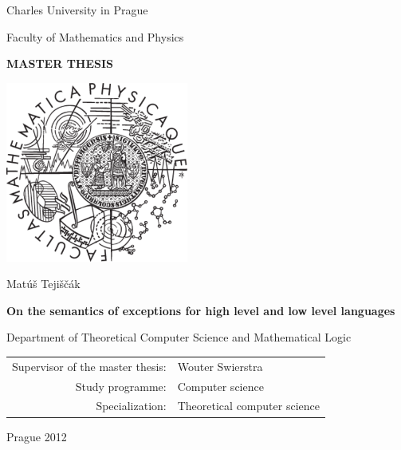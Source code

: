 \documentclass[12pt,a4paper,twoside,openright]{report}
\begin{document}


\pagestyle{empty}
\begin{center}

\large

Charles University in Prague

\medskip

Faculty of Mathematics and Physics

\vfill

{\bf\Large MASTER THESIS}

\vfill

\centerline{\mbox{\includegraphics[width=60mm]{figures/logo}}}

\vfill
\vspace{5mm}

{\LARGE Matúš Tejiščák}

\vspace{15mm}

{\LARGE\bfseries On the semantics of exceptions for high level and low level languages}

\vfill

Department of Theoretical Computer Science and Mathematical Logic

\vfill

\begin{tabular}{rl}

Supervisor of the master thesis: & Wouter Swierstra \\
\noalign{\vspace{2mm}}
Study programme: & Computer science \\
\noalign{\vspace{2mm}}
Specialization: & Theoretical computer science \\
\end{tabular}

\vfill

Prague 2012

\end{center}
\end{document}
